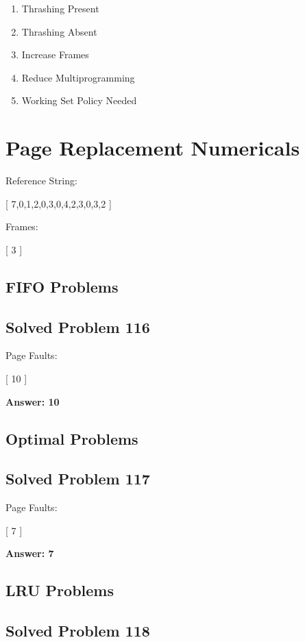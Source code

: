 \begin{enumerate}
\item Thrashing Present
\item Thrashing Absent
\item Increase Frames
\item Reduce Multiprogramming
\item Working Set Policy Needed
\end{enumerate}

\section{Page Replacement Numericals}

Reference String:

[
7,0,1,2,0,3,0,4,2,3,0,3,2
]

Frames:

[
3
]

\subsection{FIFO Problems}

\subsection{Solved Problem 116}

Page Faults:

[
10
]

\textbf{Answer: 10}

\subsection{Optimal Problems}

\subsection{Solved Problem 117}

Page Faults:

[
7
]

\textbf{Answer: 7}

\subsection{LRU Problems}

\subsection{Solved Problem 118}

